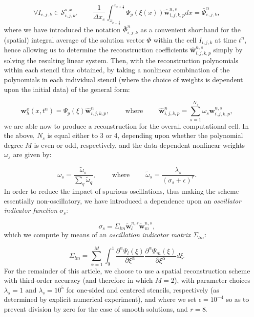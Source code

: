 \documentclass{article}
\begin{document}
\begin{equation}
\forall I_{e, j, k} \in \mathcal{S}_{i, j, k}^{s, x}, \qquad \frac{1}{\Delta x_e} \int_{x_{e - \frac{1}{2}}}^{x_{e + \frac{1}{2}}} \Psi_p \left( \xi \left( x \right) \right) \hat{\mathbf{w}}_{i, j, k, p}^{n, s} dx = \bar{\Phi}_{e, j, k}^{n},
\end{equation}
where we have introduced the notation ${\bar{\Phi}_{i, j, k}^{n}}$ as a convenient shorthand for the (spatial) integral average of the solution vector ${\Phi}$ within the cell ${I_{i, j, k}}$ at time ${t^n}$, hence allowing us to determine the reconstruction coefficients ${\hat{\mathbf{w}}_{i, j, k, p}^{n, s}}$ simply by solving the resulting linear system. Then, with the reconstruction polynomials within each stencil thus obtained, by taking a nonlinear combination of the polynomials in each individual stencil (where the choice of weights is dependent upon the initial data) of the general form:

\begin{equation}
\mathbf{w}_{h}^{x} \left( x, t^n \right) = \Psi_p \left( \xi \right) \hat{\mathbf{w}}_{i, j, k, p}^{n}, \qquad \text{ where } \qquad \hat{\mathbf{w}}_{i, j, k, p}^{n} = \sum_{s = 1}^{N_s} \omega_s \hat{\mathbf{w}}_{i, j, k, p}^{n, s},
\end{equation}
we are able now to produce a reconstruction for the overall computational cell. In the above, ${N_s}$ is equal either to 3 or 4, depending upon whether the polynomial degree $M$ is even or odd, respectively, and the data-dependent nonlinear weights ${\omega_s}$ are given by:

\begin{equation}
\omega_s = \frac{\tilde{\omega}_s}{\sum\limits_q \tilde{\omega}_q}, \qquad \text{ where } \qquad \tilde{\omega}_s = \frac{\lambda_s}{\left( \sigma_s + \epsilon \right)^r}.
\end{equation}
In order to reduce the impact of spurious oscillations, thus making the scheme essentially non-oscillatory, we have introduced a dependence upon an \textit{oscillator indicator function} ${\sigma_s}$:

\begin{equation}
\sigma_s = \Sigma_{l m} \tilde{\mathbf{w}}_{l}^{n, s} \tilde{\mathbf{w}}_{m}^{n, s},
\end{equation}
which we compute by means of an \textit{oscillation indicator matrix} ${\Sigma_{l m}}$\cite{dumbser}:

\begin{equation}
\Sigma_{l m} = \sum_{\alpha = 1}^{M} \int_{0}^{1} \frac{\partial^{\alpha} \Psi_l \left( \xi \right)}{\partial \xi^{\alpha}} \frac{\partial^{\alpha} \Psi_m \left( \xi \right)}{\partial \xi^{\alpha}} d \xi.
\end{equation}
For the remainder of this article, we choose to use a spatial reconstruction scheme with third-order accuracy (and therefore in which ${M = 2}$), with parameter choices ${\lambda_s = 1}$ and ${\lambda_s = 10^5}$ for one-sided and centered stencils, respectively (as determined by explicit numerical experiment), and where we set ${\epsilon = 10^{-4}}$ so as to prevent division by zero for the case of smooth solutions, and ${r = 8}$.
\end{document}
